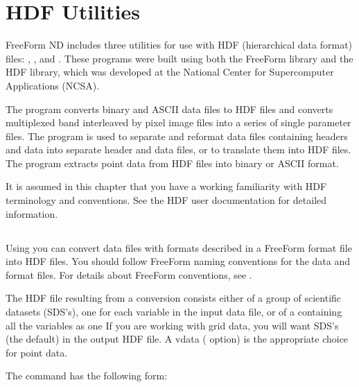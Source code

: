 %
%

\chapter{HDF Utilities}
\label{ff,hdf}

FreeForm ND includes three utilities for use with HDF (hierarchical
data format) files: , , and .
These programs were built using both the FreeForm library and the HDF
library, which was developed at the National Center for Supercomputer
Applications (NCSA).

The  program converts binary and ASCII data files to HDF
files and converts multiplexed band interleaved by pixel image files
into a series of single parameter files. The  program is
used to separate and reformat data files containing headers and data
into separate header and data files, or to translate them into HDF
files. The  program extracts point data from HDF files
into binary or ASCII format.

It is assumed in this chapter that you have a working familiarity with
HDF terminology and conventions. See the HDF user documentation for
detailed information.


\section{}
\label{ff,hdf,makehdf}

Using  you can convert data files with formats described
in a FreeForm format file into HDF files. You should follow FreeForm
naming conventions for the data and format files. For details about
FreeForm conventions, see .


The HDF file resulting from a conversion consists either of a group of
scientific datasets (SDS's), one for each variable in the input data
file, or of a  containing all the variables as one
 If you are working with grid data, you will want SDS's
(the default) in the output HDF file. A vdata ( option) is the
appropriate choice for point data.

The  command has the following form:   

